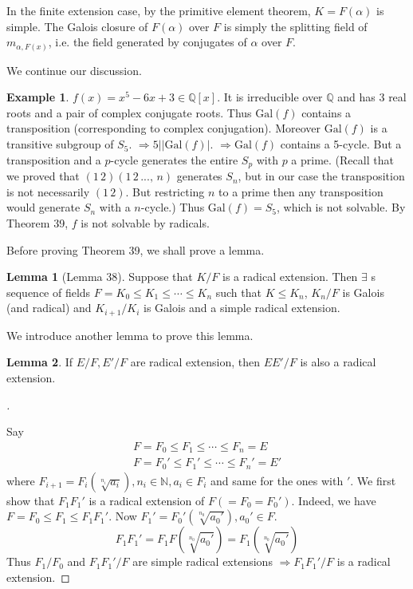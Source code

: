 \documentclass{article}
\theoremstyle{definition}
\newtheorem{ex}{Example}
\newtheorem{lem}{Lemma}
\newenvironment{proofs}[1][\proofname]{%
  \begin{proof}[#1]$ $\par\nobreak\ignorespaces
}{%
  \end{proof}
}
\newcommand{\NN}{\mathbb N}
\newcommand{\QQ}{\mathbb Q}
\newcommand{\Ra}{\Rightarrow}
\newcommand{\Gal}{\text{Gal}}
\begin{document}
In the finite extension case, by the primitive element theorem, $K = F(\alpha)$ is simple.
The Galois closure of $F(\alpha)$ over $F$ is simply the splitting field of $m_{\alpha, F(x)}$, i.e. the field generated by conjugates of $\alpha$ over $F$.

\par We continue our discussion.

\begin{ex}
	$f(x) = x^5 - 6x + 3 \in \QQ[x]$.
	It is irreducible over $\QQ$ and has 3 real roots and a pair of complex conjugate roots.
	Thus $\Gal(f)$ contains a transposition (corresponding to complex conjugation).
	Moreover $\Gal(f)$ is a transitive subgroup of $S_5$.
	$\Ra 5 | |\Gal(f)|$.
	$\Ra \Gal(f)$ contains a 5-cycle.
	But a transposition and a $p$-cycle generates the entire $S_p$ with $p$ a prime.
	(Recall that we proved that $(1 \, 2) (1 \, 2 \, ..., \, n)$ generates $S_n$, but in our case the transposition is not necessarily $(1 \, 2)$.
	But restricting $n$ to a prime then any transposition would generate $S_n$ with a $n$-cycle.)
	Thus $\Gal(f) = S_5$, which is not solvable.
	By Theorem 39, $f$ is not solvable by radicals.
\end{ex}

Before proving Theorem 39, we shall prove a lemma.

\begin{lem}[Lemma 38]
	Suppose that $K/F$ is a radical extension.
	Then $\exists$ s sequence of fields $F = K_0 \leq K_1 \leq \cdots \leq K_n$ such that $K \leq K_n$, $K_n/F$ is Galois (and radical) and $K_{i + 1}/K_i$ is Galois and a simple radical extension.
\end{lem}

We introduce another lemma to prove this lemma.

\begin{lem}
	If $E/F, E'/F$ are radical extension, then $E E'/F$ is also a radical extension.
\end{lem}

\begin{proofs}
	Say 
	\begin{align*}
		F = F_0 \leq F_1 \leq \cdots \leq F_n = E\\
		F = F_0' \leq F_1' \leq \cdots \leq F_n' = E'
	\end{align*}
	where $F_{i + 1} = F_i(\sqrt[n_i]{a_i}), n_i \in \NN, a_i \in F_i$ and same for the ones with $'$. 
	We first show that $F_1 F_1'$ is a radical extension of $F ( = F_0 = F_0')$.
	Indeed, we have $F = F_0 \leq F_1 \leq F_1 F_1'$.
	Now $F_1' = F_0'(\sqrt[n_0]{a_0'}), a_0' \in F$.
	\[
		F_1 F_1' = F_1 F(\sqrt[n_0]{a_0'}) = F_1(\sqrt[n_0]{a_0'})
	\]
	Thus $F_1/F_0$ and $F_1 F_1'/F$ are simple radical extensions $\Ra F_1 F_1'/F$ is a radical extension.
\end{proofs}
\end{document}
